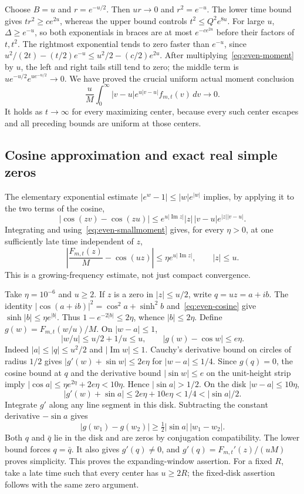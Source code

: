 \documentclass[11pt]{article}
\begin{document}
Choose $B=u$ and $r=e^{-u/2}$. Then $ur\to0$ and $r^2=e^{-u}$.
The lower time bound gives $tr^2\geq c e^{2u}$, whereas the upper
bound controls $t^2\leq Q^2e^{8u}$. For large $u$, $\Delta\geq e^{-u}$,
so both exponentials in braces are at most $e^{-ce^{2u}}$ before
their factors of $t,t^2$. The rightmost exponential tends to zero
faster than $e^{-u}$, since
$u^2/(2t)-(t/2)e^{-u}\leq u^2/2-(c/2)e^{2u}$.
After multiplying~\eqref{eq:even-moment} by $u$, the left and right
tails still tend to zero; the middle term is
$u e^{-u/2}e^{u e^{-u/2}}\to0$. We have proved the crucial uniform
actual moment conclusion
\begin{equation}\label{eq:even-smallmoment}
 \frac uM\int_0^\infty |v-u|e^{u|v-u|}f_{m,t}(v)\,dv\longrightarrow0.
\end{equation}
It holds as $t\to\infty$ for every maximizing center, because every
such center escapes and all preceding bounds are uniform at those centers.

\subsection{Cosine approximation and exact real simple zeros}
The elementary exponential estimate
$|e^w-1|\leq|w|e^{|w|}$ implies, by applying it to the two terms
of the cosine,
\[
 |\cos(zv)-\cos(zu)|
 \leq e^{u|\operatorname{Im}z|}|z|\,|v-u|e^{|z||v-u|}.
\]
Integrating and using~\eqref{eq:even-smallmoment} gives, for every
$\eta>0$, at one sufficiently late time independent of $z$,
\begin{equation}\label{eq:even-cosine}
 \left|\frac{F_{m,t}(z)}{M}-\cos(uz)\right|
 \leq\eta e^{u|\operatorname{Im}z|},\qquad |z|\leq u.
\end{equation}
This is a growing-frequency estimate, not just compact convergence.

Take $\eta=10^{-6}$ and $u\geq2$. If $z$ is a zero in $|z|\leq u/2$,
write $q=uz=a+ib$. The identity
$|\cos(a+ib)|^2=\cos^2a+\sinh^2b$ and~\eqref{eq:even-cosine}
give $\sinh|b|\leq\eta e^{|b|}$. Thus
$1-e^{-2|b|}\leq2\eta$, whence $|b|\leq2\eta$.
Define $g(w)=F_{m,t}(w/u)/M$. On $|w-a|\leq1$,
\[
 |w/u|\leq u/2+1/u\leq u,\qquad
 |g(w)-\cos w|\leq e\eta.
\]
Indeed $|a|\leq|q|\leq u^2/2$ and $|\operatorname{Im}w|\leq1$.
Cauchy's derivative bound on circles of radius $1/2$ gives
$|g'(w)+\sin w|\leq2e\eta$ for $|w-a|\leq1/4$.
Since $g(q)=0$, the cosine bound at $q$ and the derivative bound
$|\sin w|\leq e$ on the unit-height strip imply
$|\cos a|\leq\eta e^{2\eta}+2e\eta<10\eta$.
Hence $|\sin a|>1/2$. On the disk $|w-a|\leq10\eta$,
\[
 |g'(w)+\sin a|\leq2e\eta+10e\eta<1/4<|\sin a|/2.
\]
Integrate $g'$ along any line segment in this disk. Subtracting
the constant derivative $-\sin a$ gives
\[
 |g(w_1)-g(w_2)|\geq\tfrac12|\sin a|\,|w_1-w_2|.
\]
Both $q$ and $\bar q$ lie in the disk and are zeros by conjugation
compatibility. The lower bound forces $q=\bar q$. It also gives
$g'(q)\ne0$, and $g'(q)=F_{m,t}'(z)/(uM)$ proves simplicity.
This proves the expanding-window assertion. For a fixed $R$, take a
late time such that every center has $u\geq2R$; the fixed-disk
assertion follows with the same zero argument.
\end{document}
